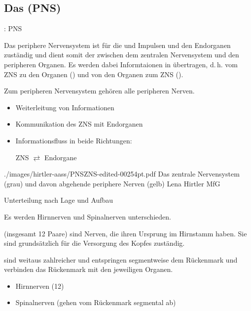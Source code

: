 \clearpage %


\subsection{Das  (PNS)}


\TextSlidePicture
{{\TxBeschreibung}: PNS}%
{%
%
Das periphere Nervensystem ist  
für die  
und Impulsen 
 und  
den Endorganen zuständig
und dient somit der  
zwischen dem zentralen Nervensystem 
und den peripheren Organen.  
%
Es werden dabei Informtaionen in  übertragen,
d.\,h. vom ZNS zu den Organen 
() 
und von den Organen
zum ZNS 
().
%

Zum peripheren Nervensystem gehören alle peripheren Nerven.
%

}%
{
\begin{itemize}
  \item Weiterleitung von Informationen
  \item Kommunikation des ZNS mit Endorganen
  \item Informationsfluss in beide Richtungen:
  
  ZNS $\rightleftarrows$ Endorgane
\end{itemize}
}%
{./images/hirtler-aass/PNSZNS-edited-00254pt.pdf}%
{Das zentrale Nervensystem (grau) 
und davon abgehende periphere Nerven (gelb)}%
{}%
{Lena Hirtler}%
{MfG}%


\TextSlide
{Unterteilung nach Lage und Aufbau}%
{%
Es werden Hirnnerven und Spinalnerven unterschieden.

 (insgesamt 12 Paare) sind Nerven, die ihren
Ursprung im Hirnstamm haben. Sie sind grundsätzlich für die
Versorgung des Kopfes zuständig.


 sind weitaus zahlreicher
und entspringen segmentweise dem Rückenmark 
und verbinden das Rückenmark mit den jeweiligen Organen. 

}%
{
\begin{itemize}
    \item Hirnnerven (12)
    \item Spinalnerven (gehen vom Rückenmark segmental ab)
\end{itemize}}%


